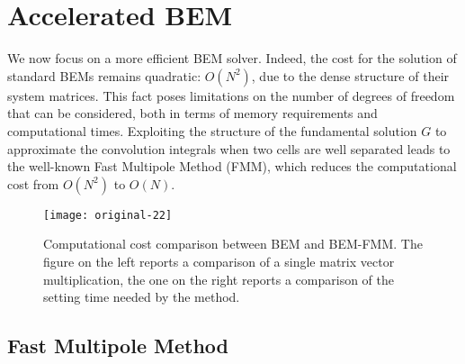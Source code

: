 
\section{Accelerated BEM}
\label{sec:fast}

We now focus on a more efficient BEM solver. Indeed, the cost for the solution of standard BEMs remains quadratic: $O(N^2)$, due to the dense structure of their system matrices. This fact poses limitations on the number of degrees of freedom that can be
considered, both in terms of memory requirements and computational times. Exploiting the
structure of the fundamental solution $G$ to approximate the convolution integrals when two
cells are well separated leads to the well-known Fast Multipole Method (FMM), which reduces the computational cost from $O(N^2)$ to $O(N)$. 

\begin{figure*}[!ht]
\begin{center}
    \texttt{[image: original-22]}    %
    \caption{Computational cost comparison between BEM and BEM-FMM. The figure on the left reports a comparison of a single matrix vector multiplication, the one on the right reports a comparison of the setting time needed by the method.} 
    \label{fig:original-22}
\end{center}
\end{figure*}

\subsection{Fast Multipole Method}
\label{sub:fast_multipole_method}

